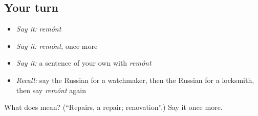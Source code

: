 \subsection*{Your turn}
\begin{itemize}
\raggedright
  \item \emph{Say it:} \emph{remónt}
  \item \emph{Say it:} \emph{remónt}, once more
  \item \emph{Say it:} a sentence of your own with \emph{remónt}
  \item \emph{Recall:} say the Russian for a watchmaker, then the Russian for a locksmith, then say \emph{remónt} again
\end{itemize}

\begin{tcolorbox}[breakable,colback=teal!4,colframe=teal!35!black,title={Before you move on}]
What does  mean? (\textquotedblleft{}Repairs, a repair; renovation\textquotedblright{}.) Say it once more.
\end{tcolorbox}
